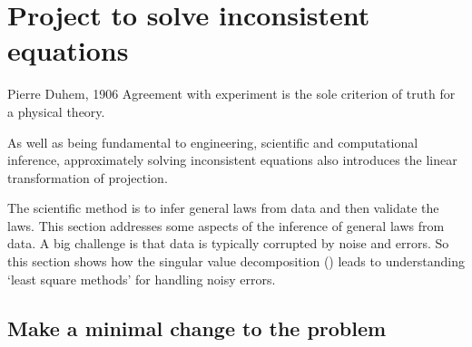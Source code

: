 

\section{Project to solve inconsistent equations}
\label{sec:asie}
\secttoc


\begin{comment}
 \cite[Ch.~7, 12]{Chartier2015}
\end{comment}

\begin{quoted}{Pierre Duhem, 1906}
Agreement with experiment is the sole criterion of truth for a physical theory.
\end{quoted}

\begin{aside}
As well as being fundamental to engineering, scientific and computational inference, approximately solving inconsistent equations also introduces the linear transformation of projection.
\end{aside}

The scientific method is to infer general laws from data and then validate the laws.
This section addresses some aspects of the inference of general laws from data.
A big challenge is that data is typically corrupted by noise and errors.
So this section shows how the singular value decomposition (\svd) leads to understanding `least square methods' for handling noisy errors.



\subsection{Make a minimal change to the problem}
\label{sec:mmctp}

\begin{comment}
This first example introduces a new, linear algebra, view of approximation in a context that relates to students and one they know the answer.  
\end{comment}

